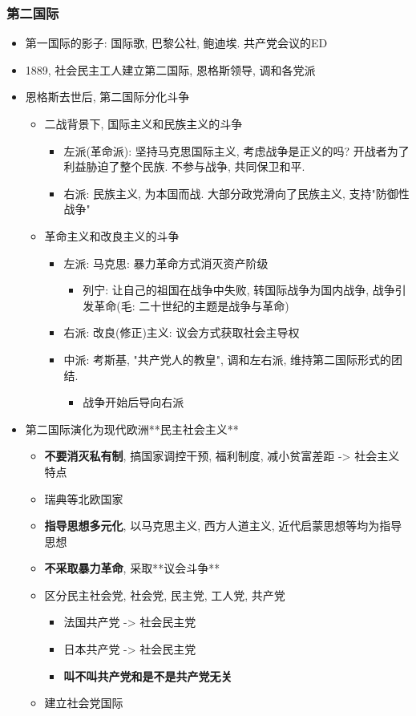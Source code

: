\documentclass[11pt]{article}
\begin{document}
\subsubsection{第二国际}
\label{sec:orge6c9234}
\begin{itemize}
\item 第一国际的影子: 国际歌, 巴黎公社, 鲍迪埃. 共产党会议的ED
\item 1889, 社会民主工人建立第二国际, 恩格斯领导, 调和各党派
\item 恩格斯去世后, 第二国际分化斗争
\begin{itemize}
\item 二战背景下, 国际主义和民族主义的斗争
\begin{itemize}
\item 左派(革命派): 坚持马克思国际主义, 考虑战争是正义的吗? 开战者为了利益胁迫了整个民族. 不参与战争, 共同保卫和平.
\item 右派: 民族主义, 为本国而战. 大部分政党滑向了民族主义, 支持"防御性战争"
\end{itemize}
\item 革命主义和改良主义的斗争
\begin{itemize}
\item 左派: 马克思: 暴力革命方式消灭资产阶级
\begin{itemize}
\item 列宁: 让自己的祖国在战争中失败, 转国际战争为国内战争, 战争引发革命(毛: 二十世纪的主题是战争与革命)
\end{itemize}
\item 右派: 改良(修正)主义: 议会方式获取社会主导权
\item 中派: 考斯基, "共产党人的教皇", 调和左右派, 维持第二国际形式的团结. 
\begin{itemize}
\item 战争开始后导向右派
\end{itemize}
\end{itemize}
\end{itemize}
\item 第二国际演化为现代欧洲**民主社会主义**
\begin{itemize}
\item \textbf{不要消灭私有制}, 搞国家调控干预, 福利制度, 减小贫富差距 -> 社会主义特点
\item 瑞典等北欧国家
\item \textbf{指导思想多元化}, 以马克思主义, 西方人道主义, 近代启蒙思想等均为指导思想
\item \textbf{不采取暴力革命}, 采取**议会斗争**
\item 区分民主社会党, 社会党, 民主党, 工人党, 共产党
\begin{itemize}
\item 法国共产党 -> 社会民主党
\item 日本共产党 -> 社会民主党
\item \textbf{叫不叫共产党和是不是共产党无关}
\end{itemize}
\item 建立社会党国际
\end{itemize}
\end{itemize}
\end{document}
